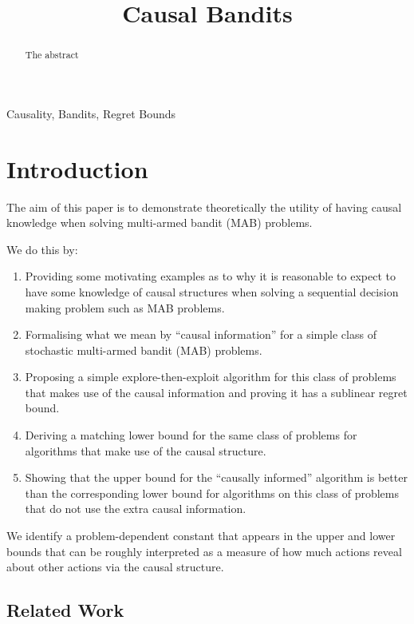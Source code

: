 \documentclass[wcp]{jmlr}
\title[Causal Bandits]{Causal Bandits}
\author{\Name{Author's Name}}
\begin{document}
\maketitle

\begin{abstract}
	The abstract
\end{abstract}
\begin{keywords}
	Causality, Bandits, Regret Bounds
\end{keywords}

\section{Introduction}
\label{sec:intro}

The aim of this paper is to demonstrate theoretically the utility of having 
causal knowledge when solving multi-armed bandit (MAB) problems.

We do this by:
\begin{enumerate}
	\item Providing some motivating examples as to why it is reasonable to expect
		to have some knowledge of causal structures when solving a sequential
		decision making problem such as MAB problems.
	\item Formalising what we mean by ``causal information'' for a simple
		class of stochastic multi-armed bandit (MAB) problems. 
	\item Proposing a simple explore-then-exploit algorithm for this class of
		problems that makes use of the causal information and proving it
		has a sublinear regret bound.
	\item Deriving a matching lower bound for the same class of problems for 
		algorithms that make use of the causal structure.
	\item Showing that the upper bound for the ``causally informed'' algorithm
		is better than the corresponding lower bound for algorithms on this 
		class of problems that do not use the extra causal information.
\end{enumerate}

We identify a problem-dependent constant that appears in the upper and lower 
bounds that can be roughly interpreted as a measure of how much actions reveal
about other actions via the causal structure.

\subsection{Related Work}
\label{sub:related_work}
\end{document}
